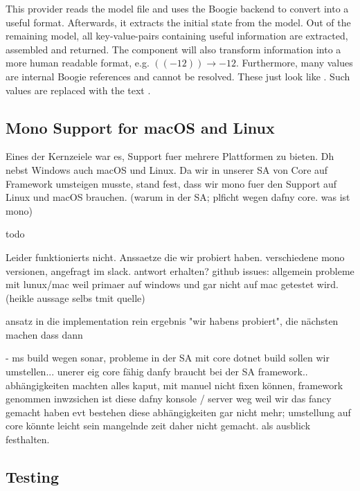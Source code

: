 This provider reads the model file and uses the Boogie backend to convert into a useful format.
Afterwards, it extracts the initial state from the model.
Out of the remaining model, all key-value-pairs containing useful information are extracted, assembled and returned.
The component will also transform information into a more human readable format, e.g. $((- 12)) \rightarrow -12$.
Furthermore, many values are internal Boogie references and cannot be resolved.
These just look like .
Such values are replaced with the text .\\


\subsection{Mono Support for macOS and Linux}
\label{section:implementation:mono}

Eines der Kernzeiele war es, Support fuer mehrere Plattformen zu bieten. Dh nebst Windows auch macOS und Linux.
Da wir in unserer SA von Core auf Framework umsteigen musste, stand fest, dass wir mono fuer den Support auf Linux und macOS brauchen.
(warum in der SA; plficht wegen dafny core. was ist mono)

todo

Leider funktionierts nicht.
Anssaetze die wir probiert haben. verschiedene mono versionen, angefragt im slack. antwort erhalten?
github issues: allgemein probleme mit lunux/mac weil primaer auf windows und gar nicht auf mac getestet wird. (heikle aussage selbs tmit quelle)

ansatz in die implementation rein
ergebnis "wir habens probiert", die nächsten machen dass dann

- ms build wegen sonar, probleme in der SA mit core
dotnet build sollen wir umstellen...
unerer eig core fähig
danfy braucht bei der SA framework.. abhängigkeiten machten alles kaput, mit manuel nicht fixen können, framework genommen
inwzsichen ist diese dafny konsole / server weg weil wir das fancy gemacht haben
evt bestehen diese abhängigkeiten gar nicht mehr; umstellung auf core könnte leicht sein
mangelnde zeit daher nicht gemacht. als ausblick festhalten.

\cite{sa}
\cite{mono-slack}
\cite{mono-git}

\subsection{Testing}

